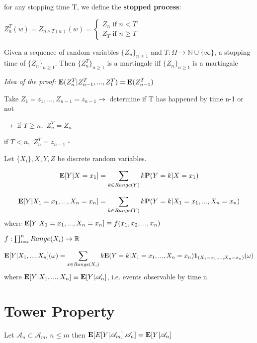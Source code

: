 \documentclass[main]{subfiles}
\begin{document}
\begin{definition}
    for any stopping time T, we define the \textbf{stopped process}:

    $Z_n^T(w) = Z_{n \wedge T(w)}(w)=
        \begin{cases}
            Z_n \text{ if }n<T \\
            Z_T \text{ if } n \geq T
        \end{cases}$
\end{definition}

\begin{theorem}
    Given a sequence of random variables $\{Z_n\}_{n\geq 1}$ and $T: \Omega \longrightarrow \mathbb{N} \cup \{\infty\}$, a stopping time of $\{Z_n\}_{n\geq 1}$. Then $\{Z_n^T\}_{n\geq 1}$ is a martingale iff $\{Z_n\}_{n\geq 1}$ is a martingale
\end{theorem}

\textit{Idea of the proof:}
$\mathbf E(Z_n^T| Z_{n-1}^T, ..., Z_1^T)= \mathbf E(Z_{n-1}^T)$

Take $Z_1 = z_1, ... , Z_{n-1} = z_{n-1} \rightarrow$ determine if T has happened by time n-1 or not

$\rightarrow$ if $T \geq n,$  $Z_n^T= Z_n$

\hspace{4mm}	if $T < n, $  $Z_n^T= z_{n-1}$ $\square$



Let $\{X_i\}, X, Y, Z$ be discrete random variables.

\begin{equation}
    \mathbf E[Y| X=x_1] = \sum_{k \in Range(Y)}k\mathbf P(Y=k| X=x_1)
\end{equation}

\begin{equation}
    \mathbf E[Y| X_1=x_1, ..., X_n=x_n] = \sum_{k \in Range(Y)}k\mathbf P(Y=k| X_1=x_1, ..., X_n=x_n)
\end{equation}
where $\mathbf E[Y| X_1=x_1, ..., X_n=x_n]\equiv f(x_1, x_2,..., x_n)$

$ f: \prod_{i=i}^n Range(X_i) \rightarrow \mathbb R$

\begin{eqnarray}
    \mathbf E[Y| X_1, ..., X_n](\omega) = \sum_{x \in Range(X_i)}k\mathbf E(Y=k| X_1=x_1, ..., X_n=x_n)\mathbf{1}_{(X_1=x_1, ..., X_n=x_n)}(\omega)
\end{eqnarray}
where $\mathbf E[Y| X_1, ..., X_n] \equiv \mathbf E[Y| \mathscr{A}_n]$, i.e. events observable by time n.


\section{Tower Property}
Let $\mathscr{A}_n \subset \mathscr{A}_m $, $n \leq m$
then $\mathbf E[E[Y|\mathscr{A}_m]|\mathscr{A}_n]= \mathbf E[Y|\mathscr{A}_n]$
\end{document}
